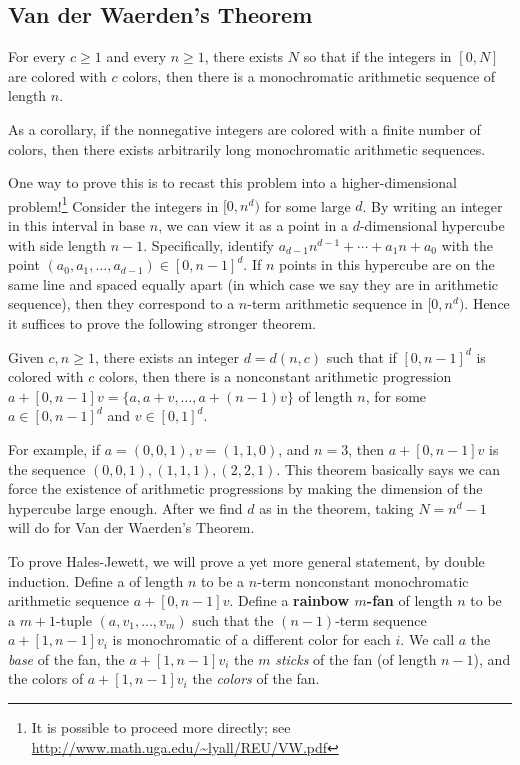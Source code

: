 \subsection{Van der Waerden's Theorem}
\begin{thm} 
For every $c\geq 1$ and every $n\geq 1$, there exists $N$ so that if the integers in $[0,N]$ are colored with $c$ colors, then there is a monochromatic arithmetic sequence of length $n$.

As a corollary, if the nonnegative integers are colored with a finite number of colors, then there exists arbitrarily long monochromatic arithmetic sequences.
\end{thm}
One way to prove this is to recast this problem into a higher-dimensional problem!{\footnote{It is possible to proceed more directly; see \url{http://www.math.uga.edu/~lyall/REU/VW.pdf}}} Consider the integers in $[0,n^d)$ for some large $d$. By writing an integer in this interval in base $n$, we can view it as a point in a $d$-dimensional hypercube with side length $n-1$. Specifically, identify $a_{d-1}n^{d-1}+\cdots +a_1n+a_0$ with the point $(a_0,a_1,\ldots, a_{d-1})\in [0,n-1]^d$. If $n$ points in this hypercube are on the same line and spaced equally apart (in which case we say they are in arithmetic sequence), then they correspond to a $n$-term arithmetic sequence in $[0,n^d)$. Hence it suffices to prove the following stronger theorem.

\begin{thm} Given $c,n\geq 1$, there exists an integer $d=d(n,c)$ such that if $[0,n-1]^d$ is colored with $c$ colors, then there is a nonconstant arithmetic progression $a+[0,n-1]v=\{a,a+v,\ldots, a+(n-1)v\}$ of length $n$, for some $a\in [0,n-1]^d$ and $v\in [0,1]^d$.
\end{thm}
For example, if $a=(0,0,1),v=(1,1,0)$, and $n=3$, then $a+[0,n-1]v$ is the sequence $(0,0,1), (1,1,1), (2,2,1)$. This theorem basically says we can force the existence of arithmetic progressions by making the dimension of the hypercube large enough. After we find $d$ as in the theorem, taking $N=n^d-1$ will do for Van der Waerden's Theorem.

To prove Hales-Jewett, we will prove a yet more general statement, by double induction. Define a  of length $n$ to be a $n$-term nonconstant monochromatic arithmetic sequence $a+[0,n-1]v$. Define a \textbf{rainbow $m$-fan} of length $n$ to be a $m+1$-tuple $(a,v_1,\ldots, v_m)$ such that the $(n-1)$-term sequence $a+[1,n-1]v_i$ is monochromatic of a different color for each $i$. We call $a$ the {\it base} of the fan, the $a+[1,n-1]v_i$ the $m$ {\it sticks} of the fan (of length $n-1$), and the colors of $a+[1,n-1]v_i$ the {\it colors} of the fan.

